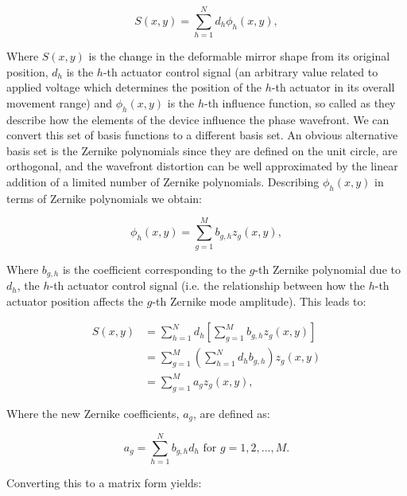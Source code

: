\begin{equation}\label{eq:surface_shape}
S(x,y) = \sum_{h=1}^{N} d_{h}\phi_{h}(x,y),
\end{equation}

Where $S(x,y)$ is the change in the deformable mirror shape from its
original position, $d_h$ is the $h$-th actuator control signal
(an arbitrary value related to applied voltage which
determines the position of the $h$-th actuator in its overall
movement range) and $\phi_{h}(x,y)$ is the $h$-th influence
function, so called as they describe how the elements 
of the device influence the phase wavefront. We can convert
this set of basis functions to a different basis set. An 
obvious alternative basis set is the Zernike polynomials 
since they are defined on the unit circle, are orthogonal, and 
the wavefront distortion can be well approximated by the linear 
addition of a limited number of Zernike 
polynomials\cite{noll1976zernike,von1934beugungstheorie}.
Describing $\phi_{h}(x,y)$ in terms of Zernike polynomials we
obtain:

\begin{equation}\label{eq:influence_to_zernike}
\phi_{h}(x,y) = \sum_{g=1}^{M} b_{g,h}z_{g}(x,y),
\end{equation}

Where $b_{g,h}$ is the coefficient corresponding to the $g$-th
Zernike polynomial due to $d_h$, the $h$-th actuator control
signal (i.e. the relationship between how the $h$-th actuator 
position affects the $g$-th Zernike mode amplitude). This leads to:

\begin{equation}\label{eq:zernike_sub}
\begin{split}
S(x,y) & = \sum_{h=1}^{N} d_{h}\left[\sum_{g=1}^{M} b_{g,h}z_{g}(x,y)\right] \\
& =\sum_{g=1}^{M} \left(\sum_{h=1}^{N} d_{h} b_{g,h}\right) z_{g}(x,y) \\
& =\sum_{g=1}^{M} a_{g} z_{g}(x,y),
\end{split}
\end{equation}

Where the new Zernike coefficients, $a_{g}$, are defined as:

\begin{equation}\label{eq:new_z_coef}
a_{g} = \sum_{h=1}^{N} b_{g,h} d_{h} \text{~for~} g=1,2,...,M.
\end{equation}

Converting this to a matrix form yields:

